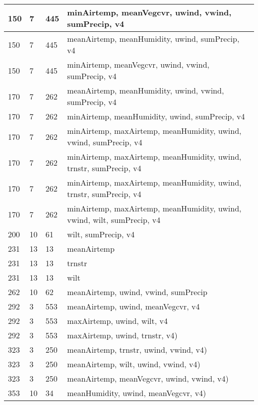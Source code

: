 \begin{longtable}{ |p{3cm}||p{3cm}|p{3cm}|p{3cm}|  }
 \hline
 150 & 7  & 445 & minAirtemp, meanVegcvr, uwind, vwind, sumPrecip, v4\\
 \hline
150 & 7  & 445 & meanAirtemp, meanHumidity, uwind, sumPrecip, v4\\
 \hline
 150 & 7  & 445 & minAirtemp, meanVegcvr, uwind, vwind, sumPrecip, v4\\
  \hline
 170 & 7  & 262 & meanAirtemp, meanHumidity, uwind, vwind, sumPrecip, v4\\
 \hline
 170 & 7  & 262 & minAirtemp, meanHumidity, uwind, sumPrecip, v4\\
 \hline
 170 & 7  & 262 & minAirtemp, maxAirtemp, meanHumidity, uwind, vwind, sumPrecip, v4\\
 \hline
  170 & 7  & 262 & minAirtemp, maxAirtemp, meanHumidity, uwind, trnstr, sumPrecip, v4\\
 \hline
   170 & 7  & 262 & minAirtemp, maxAirtemp, meanHumidity, uwind, trnstr, sumPrecip, v4\\
 \hline
   170 & 7  & 262 & minAirtemp, maxAirtemp, meanHumidity, uwind, vwind, wilt, sumPrecip, v4\\
 \hline
    200 & 10  & 61 & wilt, sumPrecip, v4\\
 \hline
     231 & 13  & 13 & meanAirtemp\\
 \hline
      231 & 13  & 13 & trnstr\\
 \hline
      231 & 13  & 13 & wilt\\
 \hline
       262 & 10  & 62 & meanAirtemp, uwind, vwind, sumPrecip\\
 \hline
        292 & 3  & 553 & meanAirtemp, uwind, meanVegcvr, v4\\
 \hline
         292 & 3  & 553 & maxAirtemp, uwind, wilt, v4\\
 \hline
          292 & 3  & 553 & maxAirtemp, uwind, trnstr, v4)\\
 \hline
          323 & 3  & 250 & meanAirtemp, trnstr, uwind, vwind, v4)\\
 \hline
           323 & 3  & 250 & meanAirtemp, wilt, uwind, vwind, v4)\\
 \hline
            323 & 3  & 250 & meanAirtemp, meanVegcvr, uwind, vwind, v4)\\
 \hline
             353 & 10  & 34 & meanHumidity, uwind, meanVegcvr, v4)\\
 \hline
\end{longtable}


